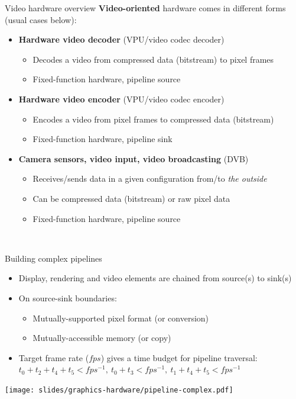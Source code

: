 \begin{frame}{Video hardware overview}
  \textbf{Video-oriented} hardware comes in different forms (usual cases below):

  \begin{itemize}
  \item \textbf{Hardware video decoder} (VPU/video codec decoder)
  \begin{itemize}
    \item Decodes a video from compressed data (bitstream) to pixel frames
    \item Fixed-function hardware, pipeline source
  \end{itemize}
  \item \textbf{Hardware video encoder} (VPU/video codec encoder)
  \begin{itemize}
    \item Encodes a video from pixel frames to compressed data (bitstream)
    \item Fixed-function hardware, pipeline sink
  \end{itemize}
  \item \textbf{Camera sensors, video input, video broadcasting} (DVB)
  \begin{itemize}
    \item Receives/sends data in a given configuration from/to \textit{the outside}
    \item Can be compressed data (bitstream) or raw pixel data
    \item Fixed-function hardware, pipeline source
  \end{itemize}
  \end{itemize}~
\end{frame}

\begin{frame}{Building complex pipelines}

  \begin{itemize}
  \item Display, rendering and video elements are chained from source(s) to sink(s)
  \item On source-sink boundaries:
    \begin{itemize}
    \item Mutually-supported pixel format (or conversion)
    \item Mutually-accessible memory (or copy)
    \end{itemize}
  \item Target frame rate (\(fps\)) gives a time budget for pipeline traversal:
  \( t_0 + t_2 + t_4 + t_5 < fps^{-1},~ t_0 + t_3 < fps^{-1},~ t_1 + t_4 + t_5 < fps^{-1} \)
  \end{itemize}

  \begin{center}
  \texttt{[image: slides/graphics-hardware/pipeline-complex.pdf]}
  \end{center}

\end{frame}

